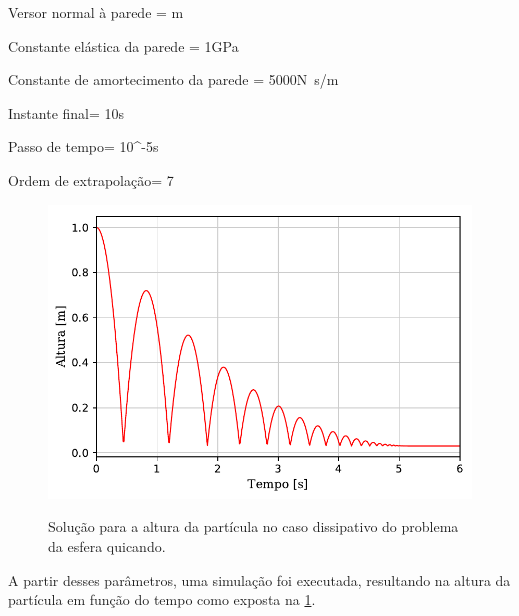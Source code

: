 \begin{table}[h]
\begin{parametersdesc}
	\item{Versor normal à parede}{\ind{\planeNormalVersor}{\element} = }{\si\metre}
	\item{Constante elástica da parede}{\ind{\elasticModulus}{\element} = 1}{\si[per-mode=symbol]{\giga\pascal}}
	\item{Constante de amortecimento da parede}{\ind{\normalDampingConstant}{\element} = \SI{5000}{}}{\si[per-mode=symbol]{\newton\second\per\meter}}
	\hline
	\item{Instante final}{\finalInstant = 10}{\si\second} 
	\item{Passo de tempo}{\Dt = 10^{-5}}{\si\second}
	\item{Ordem de extrapolação}{\taylorOrder = 7}{\emptyUnit}
\end{parametersdesc}
\sourceMe 
\end{table}

\begin{figure}[htb!]
	\caption{Solução para a altura da partícula no caso dissipativo do problema da esfera quicando.}
	\centering
		\includegraphics[scale=1]{images/bouncing_sphere/dissipative/y_position.pdf}
	\label{fig:bouncing_sphere_y_position}
	\sourceMe
\end{figure}

A partir desses parâmetros, uma simulação foi executada, resultando na altura da partícula em função do tempo como exposta na \cref{fig:bouncing_sphere_y_position}.

